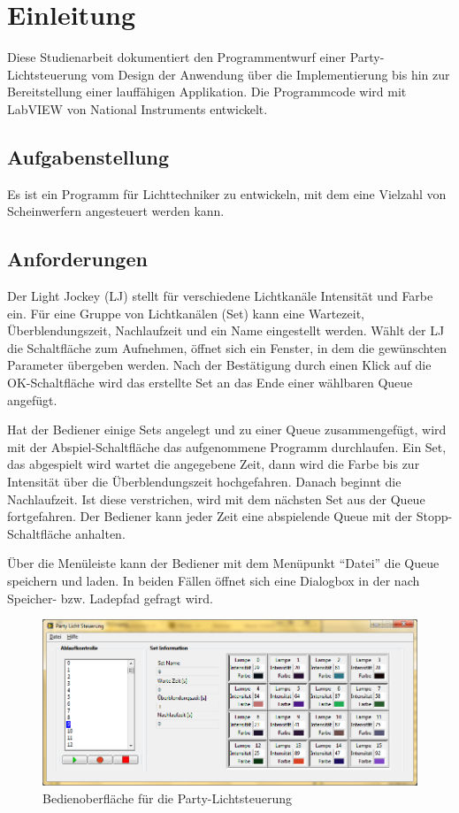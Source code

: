 \section{Einleitung}%

Diese Studienarbeit dokumentiert den Programmentwurf einer Party-Lichtsteuerung vom Design der Anwendung über die Implementierung bis hin zur Bereitstellung einer lauffähigen Applikation.
Die Programmcode wird mit LabVIEW von National Instruments entwickelt.

\subsection{Aufgabenstellung}
Es ist ein Programm für Lichttechniker zu entwickeln, mit dem eine Vielzahl von Scheinwerfern angesteuert werden kann. 

\subsection{Anforderungen}
Der Light Jockey (LJ) stellt für verschiedene Lichtkanäle Intensität und Farbe ein. 
Für eine Gruppe von Lichtkanälen (Set) kann eine Wartezeit, Überblendungszeit, Nachlaufzeit und ein Name eingestellt werden. 
Wählt der LJ die Schaltfläche zum Aufnehmen, öffnet sich ein Fenster, in dem die gewünschten Parameter übergeben werden. 
Nach der Bestätigung durch einen Klick auf die OK-Schaltfläche wird das erstellte Set an das Ende einer wählbaren Queue angefügt.

Hat der Bediener einige Sets angelegt und zu einer Queue zusammengefügt, wird mit der Abspiel-Schaltfläche das aufgenommene Programm durchlaufen. 
Ein Set, das abgespielt wird wartet die angegebene Zeit, dann wird die Farbe bis zur Intensität über die Überblendungszeit hochgefahren. 
Danach beginnt die Nachlaufzeit.
Ist diese verstrichen, wird mit dem nächsten Set aus der Queue fortgefahren. 
Der Bediener kann jeder Zeit eine abspielende Queue mit der Stopp-Schaltfläche anhalten.

Über die Menüleiste kann der Bediener mit dem Menüpunkt "`Datei"' die Queue speichern und laden. 
In beiden Fällen öffnet sich eine Dialogbox in der nach Speicher- bzw. Ladepfad gefragt wird.

	\begin{figure}%
	\centering
		\includegraphics[width=\textwidth]{Pics/Oberflaeche001.png}
	\caption{Bedienoberfläche für die Party-Lichtsteuerung}
	\label{fig:ober001}
	\end{figure}



